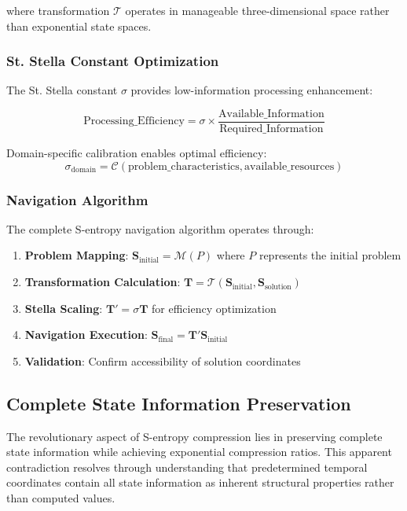 \documentclass[12pt,a4paper]{article}
\begin{document}
where transformation $\mathcal{T}$ operates in manageable three-dimensional space rather than exponential state spaces.

\subsubsection{St. Stella Constant Optimization}

The St. Stella constant $\sigma$ provides low-information processing enhancement:

$$\text{Processing\_Efficiency} = \sigma \times \frac{\text{Available\_Information}}{\text{Required\_Information}}$$

Domain-specific calibration enables optimal efficiency:
$$\sigma_{\text{domain}} = \mathcal{C}(\text{problem\_characteristics}, \text{available\_resources})$$

\subsubsection{Navigation Algorithm}

The complete S-entropy navigation algorithm operates through:

\begin{enumerate}
\item \textbf{Problem Mapping}: $\mathbf{S}_{\text{initial}} = \mathcal{M}(P)$ where $P$ represents the initial problem
\item \textbf{Transformation Calculation}: $\mathbf{T} = \mathcal{T}(\mathbf{S}_{\text{initial}}, \mathbf{S}_{\text{solution}})$
\item \textbf{Stella Scaling}: $\mathbf{T}' = \sigma \mathbf{T}$ for efficiency optimization
\item \textbf{Navigation Execution}: $\mathbf{S}_{\text{final}} = \mathbf{T}' \mathbf{S}_{\text{initial}}$
\item \textbf{Validation}: Confirm accessibility of solution coordinates
\end{enumerate}

\subsection{Complete State Information Preservation}

The revolutionary aspect of S-entropy compression lies in preserving complete state information while achieving exponential compression ratios. This apparent contradiction resolves through understanding that predetermined temporal coordinates contain all state information as inherent structural properties rather than computed values.
\end{document}
